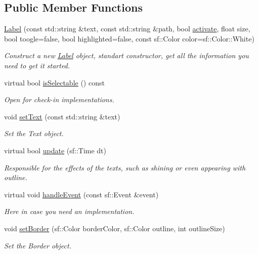 \subsection*{Public Member Functions}
\begin{DoxyCompactItemize}
\item 
\hyperlink{classLabel_ab2454e0a3b79602c481d48f40b5f7a41}{Label} (const std\+::string \&text, const std\+::string \&path, bool \hyperlink{classComponent_aaab29ea159109b4d0f63e9c519be6139}{activate}, float size, bool toogle=false, bool highlighted=false, const sf\+::\+Color color=sf\+::\+Color\+::\+White)
\begin{DoxyCompactList}\small\item\em Construct a new \hyperlink{classLabel}{Label} object, standart constructor, get all the information you need to get it started. \end{DoxyCompactList}\item 
virtual bool \hyperlink{classLabel_ac27e6e31942be4612d282af282b65051}{is\+Selectable} () const
\begin{DoxyCompactList}\small\item\em Open for check-\/in implementations. \end{DoxyCompactList}\item 
void \hyperlink{classLabel_a2bd65842919bc965ff8482407b34f097}{set\+Text} (const std\+::string \&text)
\begin{DoxyCompactList}\small\item\em Set the Text object. \end{DoxyCompactList}\item 
virtual bool \hyperlink{classLabel_a5f1713cf4793b46cf0370ce2d447e722}{update} (sf\+::\+Time dt)
\begin{DoxyCompactList}\small\item\em Responsible for the effects of the texts, such as shining or even appearing with outline. \end{DoxyCompactList}\item 
virtual void \hyperlink{classLabel_a2fd9614a68f0a6b89d3a50316ec4172c}{handle\+Event} (const sf\+::\+Event \&event)
\begin{DoxyCompactList}\small\item\em Here in case you need an implementation. \end{DoxyCompactList}\item 
void \hyperlink{classLabel_ab881215fca0b1450c7c725c333c86220}{set\+Border} (sf\+::\+Color border\+Color, sf\+::\+Color outline, int outline\+Size)
\begin{DoxyCompactList}\small\item\em Set the Border object. \end{DoxyCompactList}\end{DoxyCompactItemize}


